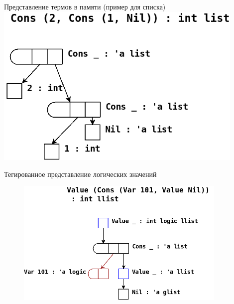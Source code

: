 \documentclass[10pt, mathserif]{beamer}
\theoremstyle{definition}
\begin{document}
\begin{frame}[fragile]{Представление термов в памяти (пример для списка)}
  \centering
  \includegraphics[width=0.9\textwidth]{img1.png}

\end{frame}


\begin{frame}[fragile]{Тегированное представление логических значений}
  \begin{figure}
  \centering
  \includegraphics[width=0.9\textwidth]{img3.png}
  \end{figure}
\end{frame}
\end{document}
